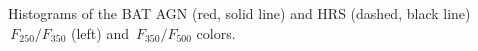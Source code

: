 \label{fig:hist_250_350_color} Histograms of the BAT AGN (red, solid line) and HRS (dashed, black line) $\,F_{250}/F_{350}$ (left) and  $\,F_{350}/F_{500}$ colors.  